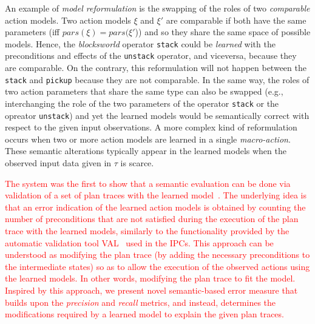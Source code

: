 An example of \emph{model reformulation} is the swapping of the roles of two {\em comparable} action models. Two action models $\xi$ and $\xi'$ are comparable if both have the same parameters (iff $pars(\xi)=pars(\xi'$)) and so they share the same space of possible models. Hence, the {\em blocksworld} operator {\small\tt stack} could be {\em learned} with the preconditions and effects of the {\small\tt unstack} operator, and viceversa, because they are comparable. On the contrary, this reformulation will not happen between the {\tt stack} and {\tt pickup} because they are not comparable. In the same way, the roles of two action parameters that share the same type can also be swapped (e.g., interchanging the role of the two parameters of the operator {\small\tt stack} or the opreator {\small\tt unstack}) and yet the learned models would be semantically correct with respect to the given input observations. A more complex kind of reformulation occurs when two or more action models are learned in a single \emph{macro-action}. These semantic alterations typically appear in the learned models when the observed input data given in $\tau$ is scarce.


\textcolor{red}{The \ARMS system was the first to show that a semantic evaluation can be done via validation of a set of plan traces with the learned model~\cite{yang2007learning}. The underlying idea is that an error indication of the learned action models is obtained by counting the number of preconditions that are not satisfied during the execution of the plan trace with the learned models, similarly to the functionality provided by the automatic validation tool VAL~\cite{howey2004val} used in the IPCs. This approach can be understood as modifying the plan trace (by adding the necessary preconditions to the intermediate states) so as to allow the execution of the observed actions using the learned models. In other words, modifying the plan trace to fit the model. Inspired by this approach, we present novel semantic-based error measure that builds upon the {\em precision} and {\em recall} metrics, and instead, determines the modifications required by a learned model to explain the given plan traces.}

